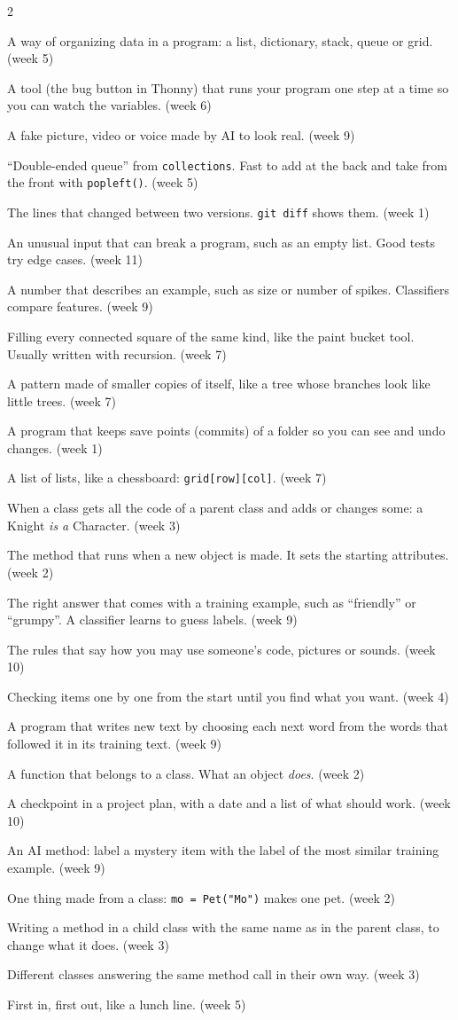 \documentclass[level=3]{kidscode}
\newcommand{\term}[3]{\item[#1] #2 \textcolor{kcgray}{\small(week #3)}}
\begin{document}
\begin{multicols}{2}
\begin{description}[leftmargin=0pt,itemsep=3pt,font=\bfseries]
\term{data structure}{A way of organizing data in a program: a list, dictionary, stack, queue or
grid.}{5}
\term{debugger}{A tool (the bug button in Thonny) that runs your program one step at a time so you
can watch the variables.}{6}
\term{deepfake}{A fake picture, video or voice made by AI to look real.}{9}
\term{deque}{\enquote{Double-ended queue} from \texttt{collections}. Fast to add at the back and take
from the front with \texttt{popleft()}.}{5}
\term{diff}{The lines that changed between two versions. \texttt{git diff} shows them.}{1}
\term{edge case}{An unusual input that can break a program, such as an empty list. Good tests try
edge cases.}{11}
\term{feature (AI)}{A number that describes an example, such as size or number of spikes.
Classifiers compare features.}{9}
\term{flood fill}{Filling every connected square of the same kind, like the paint bucket tool.
Usually written with recursion.}{7}
\term{fractal}{A pattern made of smaller copies of itself, like a tree whose branches look like
little trees.}{7}
\term{git}{A program that keeps save points (commits) of a folder so you can see and undo changes.}{1}
\term{grid (2D list)}{A list of lists, like a chessboard: \texttt{grid[row][col]}.}{7}
\term{inheritance}{When a class gets all the code of a parent class and adds or changes some:
a Knight \emph{is a} Character.}{3}
\term{\texttt{\_\_init\_\_}}{The method that runs when a new object is made. It sets the starting
attributes.}{2}
\term{label}{The right answer that comes with a training example, such as \enquote{friendly}
or \enquote{grumpy}. A classifier learns to guess labels.}{9}
\term{license}{The rules that say how you may use someone's code, pictures or sounds.}{10}
\term{linear search}{Checking items one by one from the start until you find what you want.}{4}
\term{Markov text generator}{A program that writes new text by choosing each next word from the
words that followed it in its training text.}{9}
\term{method}{A function that belongs to a class. What an object \emph{does}.}{2}
\term{milestone}{A checkpoint in a project plan, with a date and a list of what should work.}{10}
\term{nearest neighbor}{An AI method: label a mystery item with the label of the most similar
training example.}{9}
\term{object (instance)}{One thing made from a class: \texttt{mo = Pet("Mo")} makes one pet.}{2}
\term{override}{Writing a method in a child class with the same name as in the parent class, to
change what it does.}{3}
\term{polymorphism}{Different classes answering the same method call in their own way.}{3}
\term{queue}{First in, first out, like a lunch line.}{5}

\end{description}
\end{multicols}
\end{document}
